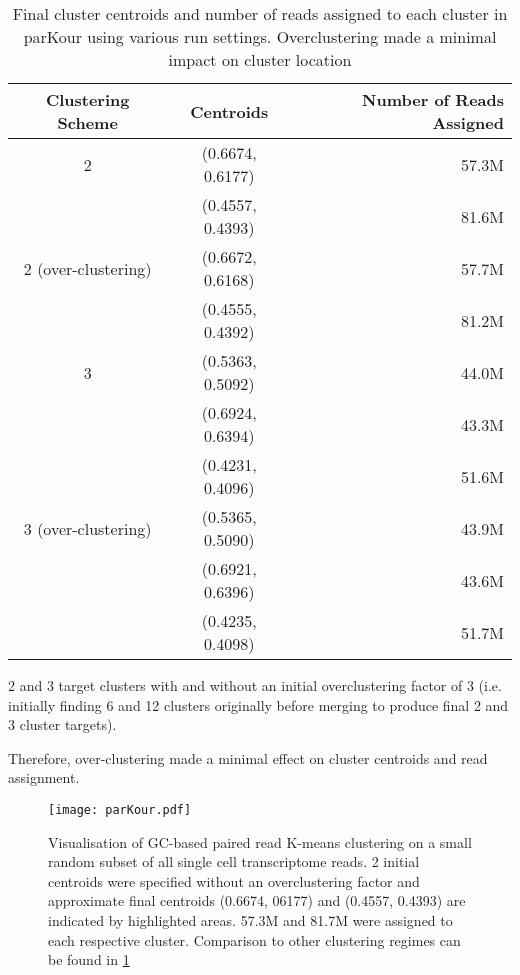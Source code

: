 \begin{table}
    \begin{tabular}{|c||c|r|}
        \hline
        Clustering Scheme & Centroids & Number of Reads Assigned \\
        \hline
        \hline
        2                    & (0.6674, 0.6177) & 57.3M \\
                             & (0.4557, 0.4393) & 81.6M \\
        \hline
        2 (over-clustering)   & (0.6672, 0.6168) & 57.7M \\
                             & (0.4555, 0.4392) & 81.2M \\
        \hline
        3                    & (0.5363, 0.5092) & 44.0M \\
                             & (0.6924, 0.6394) & 43.3M \\
                             & (0.4231, 0.4096) & 51.6M \\
        \hline
        3 (over-clustering)   & (0.5365, 0.5090) & 43.9M \\
                             & (0.6921, 0.6396) & 43.6M \\
                             & (0.4235, 0.4098) & 51.7M \\
        \hline
    \end{tabular} 
    \caption{Final cluster centroids and number of reads assigned
    to each cluster in parKour using various run settings.  Overclustering
made a minimal impact on cluster location}
    \label{tab:centroids} 
\end{table} 

2 and 3 target clusters with and without an initial 
overclustering factor of 3 (i.e. initially finding 6 and 12 clusters originally before merging to
produce final 2 and 3 cluster targets). 

Therefore, over-clustering made a minimal effect on cluster centroids and read assignment.

\begin{figure}[h]
	\centering
    \texttt{[image: parKour.pdf]}
    \caption{Visualisation of GC-based paired read K-means clustering on a small random subset of all single cell transcriptome
    reads. 2 initial centroids were specified without an overclustering factor and approximate final centroids (0.6674, 06177) and (0.4557, 0.4393) are indicated by highlighted areas.  57.3M and 81.7M were assigned to each respective cluster. Comparison to other clustering regimes can be found in \cref{tab:centroids}} 
        \label{fig:parkour} 
\end{figure}

